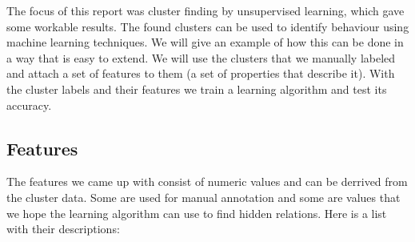 The focus of this report was cluster finding by unsupervised learning, which gave some workable results. The found clusters can be used to identify behaviour using machine learning techniques. We will give an example of how this can be done in a way that is easy to extend. We will use the clusters that we manually labeled and attach a set of features to them (a set of properties that describe it). With the cluster labels and their features we train a learning algorithm and test its accuracy.

 \subsection{Features}
 The features we came up with consist of numeric values and can be derrived from the cluster data. Some are used for manual annotation and some are values that we hope the learning algorithm can use to find hidden relations. Here is a list with their descriptions:

